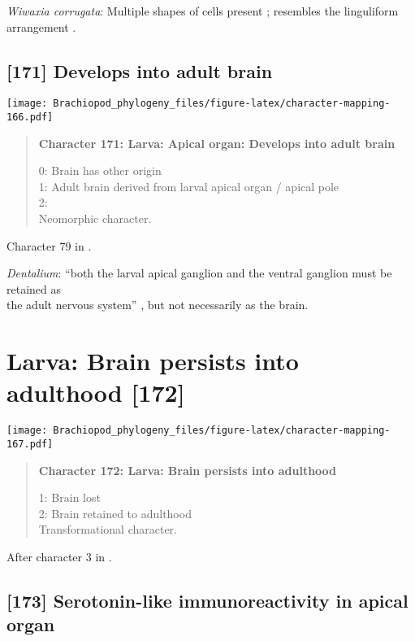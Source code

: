 \documentclass[openany]{book}
\theoremstyle{definition}
\theoremstyle{definition}
\theoremstyle{definition}
\theoremstyle{remark}
\begin{document}
\hypertarget{Wiwaxia_corrugata-coding-170}{}
\emph{Wiwaxia corrugata}: Multiple shapes of cells present
\citep{Santagata2002}; resembles the linguliform arrangement
\citep{Altenburger2010}.

\subsection*{{[}171{]} Develops into adult
brain}\label{develops-into-adult-brain}

\texttt{[image: Brachiopod\_phylogeny\_files/figure-latex/character-mapping-166.pdf]}

\begin{quote}
\textbf{Character 171: Larva: Apical organ: Develops into adult brain}

0: Brain has other origin\\
1: Adult brain derived from larval apical organ / apical pole\\
2:\\
Neomorphic character.
\end{quote}

Character 79 in \citet{Glenner2004}.

\hypertarget{Dentalium-coding-171}{}
\emph{Dentalium}: ``both the larval apical ganglion and the ventral
ganglion must be retained as\\
the adult nervous system'' \citep{HaySchmidt1992}, but not necessarily
as the brain.

\section{Larva: Brain persists into adulthood
{[}172{]}}\label{larva-brain-persists-into-adulthood-172}

\texttt{[image: Brachiopod\_phylogeny\_files/figure-latex/character-mapping-167.pdf]}

\begin{quote}
\textbf{Character 172: Larva: Brain persists into adulthood}

1: Brain lost\\
2: Brain retained to adulthood\\
Transformational character.
\end{quote}

After character 3 in \citet{Richter2010}.

\subsection*{{[}173{]} Serotonin-like immunoreactivity in apical
organ}\label{serotonin-like-immunoreactivity-in-apical-organ}
\end{document}
